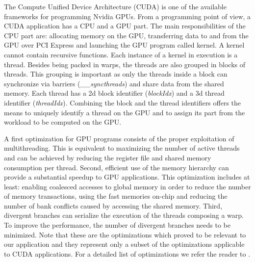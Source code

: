 The Compute Unified Device Architecture (CUDA) is one of the available
frameworks for programming Nvidia GPUs. From a programming point of view, a CUDA
application has a CPU and a GPU part. The main responsibilities of the CPU part
are: allocating memory  on the GPU, transferring data to and from the GPU over
PCI Express and launching the GPU program called kernel. A kernel cannot contain
recursive functions. Each instance of a kernel in execution is a thread. Besides
being packed in warps, the threads are also grouped in blocks of threads. This
grouping is important as only the threads inside a block can synchronize via
barriers (\emph{\_\_syncthreads}) and share data from the shared memory. Each
thread has a 2d block identifier (\emph{blockIdx}) and a 3d thread identifier
(\emph{threadIdx}). Combining the block and the thread identifiers offers the
means to uniquely identify a thread on the GPU and to assign its part from the
workload to be computed on the GPU.

A first optimization for GPU programs consists of the proper exploitation of
multithreading. This is equivalent to maximizing the number of active threads
and can be achieved by reducing the register file and shared memory consumption
per thread. Second, efficient use of the memory hierarchy can provide a
substantial speedup to GPU applications. This optimization includes at least:
enabling coalesced accesses to global memory in order to reduce the number of
memory transactions, using the fast memories on-chip and reducing the number of
bank conflicts caused by accessing the shared memory. Third, divergent branches
can serialize the execution of the threads composing a warp. To improve the
performance, the number of divergent branches needs to be minimized. Note that
these are the optimizations which proved to be relevant to our application and
they represent only a subset of the optimizations applicable to CUDA
applications. For a detailed list of optimizations we refer the reader to
\cite{cuda}.



